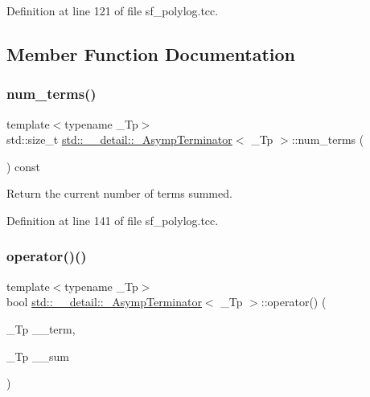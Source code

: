Definition at line 121 of file sf\+\_\+polylog.\+tcc.



\subsection{Member Function Documentation}
\mbox{\label{classstd_1_1____detail_1_1__AsympTerminator_a463f9e4e87d22b9839c12cc28b085117}} 
\subsubsection{\texorpdfstring{num\+\_\+terms()}{num\_terms()}}
{\footnotesize\ttfamily template$<$typename \+\_\+\+Tp$>$ \\
std\+::size\+\_\+t \hyperlink{classstd_1_1____detail_1_1__AsympTerminator}{std\+::\+\_\+\+\_\+detail\+::\+\_\+\+Asymp\+Terminator}$<$ \+\_\+\+Tp $>$\+::num\+\_\+terms (\begin{DoxyParamCaption}{ }\end{DoxyParamCaption}) const\hspace{0.3cm}{\ttfamily [inline]}}



Return the current number of terms summed. 



Definition at line 141 of file sf\+\_\+polylog.\+tcc.

\mbox{\label{classstd_1_1____detail_1_1__AsympTerminator_ad57254b6dcdd419b785477711b296729}} 
\subsubsection{\texorpdfstring{operator()()}{operator()()}}
{\footnotesize\ttfamily template$<$typename \+\_\+\+Tp$>$ \\
bool \hyperlink{classstd_1_1____detail_1_1__AsympTerminator}{std\+::\+\_\+\+\_\+detail\+::\+\_\+\+Asymp\+Terminator}$<$ \+\_\+\+Tp $>$\+::operator() (\begin{DoxyParamCaption}\item[{\+\_\+\+Tp}]{\+\_\+\+\_\+term,  }\item[{\+\_\+\+Tp}]{\+\_\+\+\_\+sum }\end{DoxyParamCaption})\hspace{0.3cm}{\ttfamily [inline]}}



